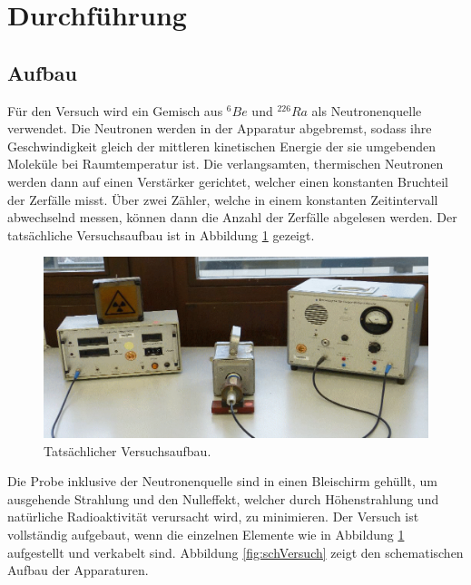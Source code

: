 \section{Durchführung}
\label{sec:Durchführung}

\subsection{Aufbau}
Für den Versuch wird ein Gemisch aus $^6Be$ und $^{226}Ra$ als Neutronenquelle verwendet. Die Neutronen werden in der Apparatur abgebremst,
sodass ihre Geschwindigkeit gleich der mittleren kinetischen Energie der sie umgebenden Moleküle bei Raumtemperatur ist.
Die verlangsamten, thermischen Neutronen werden dann auf einen Verstärker gerichtet, welcher einen konstanten Bruchteil der Zerfälle misst.
Über zwei Zähler, welche in einem konstanten Zeitintervall abwechselnd messen, können dann die Anzahl der Zerfälle abgelesen werden.
Der tatsächliche Versuchsaufbau ist in Abbildung \ref{fig:tatVersuch} gezeigt.

\begin{figure}
    \centering
    \includegraphics[width=.9\textwidth]{plots/tatVersuch.png}
    \caption{Tatsächlicher Versuchsaufbau.\cite{Versuchsanleitung}}
    \label{fig:tatVersuch}
\end{figure}

Die Probe inklusive der Neutronenquelle sind in einen Bleischirm gehüllt, um ausgehende Strahlung und den Nulleffekt, welcher durch Höhenstrahlung und natürliche Radioaktivität verursacht wird,
zu minimieren.
Der Versuch ist vollständig aufgebaut, wenn die einzelnen Elemente wie in Abbildung \ref{fig:tatVersuch} aufgestellt und verkabelt sind.
Abbildung \ref{fig:schVersuch} zeigt den schematischen Aufbau der Apparaturen.

